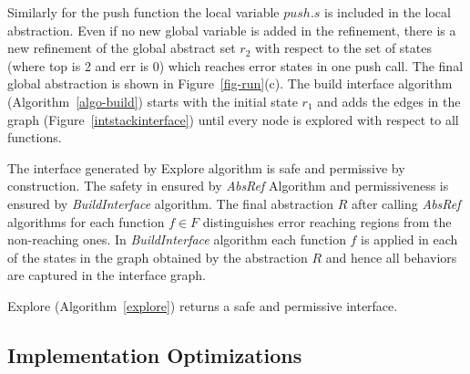 \documentclass{llncs}
\begin{document}
\begin{example}
Similarly for the push function  the local variable $push.s$ is included in the local abstraction.
Even if no new global variable is added in the refinement,  there is a new refinement of the global
abstract set $r_2$ with respect to the set of states (where top is 2 and err is 0) which reaches error 
states in one push call. 
The final global abstraction is shown in Figure~\ref{fig-run}(c).
The build interface algorithm (Algorithm~\ref{algo-build}) starts with the initial state $r_1$ 
and adds the edges in the graph (Figure~\ref{intstackinterface}) until every node is explored with 
respect to all functions. 
\end{example}

The interface generated by Explore algorithm is safe and permissive by construction. 
The safety in ensured by {\em AbsRef} Algorithm and permissiveness is ensured by 
{\em BuildInterface} algorithm.
The final abstraction $R$ after calling {\em AbsRef} algorithms for each function $f \in F$ distinguishes
error reaching regions from the non-reaching ones.	
In {\em BuildInterface} algorithm each function $f$ is applied in each of the states in the graph obtained
by the abstraction $R$ and hence all behaviors are captured in the interface graph.
\begin{theorem}
\label{theo-safety-permissive}
Explore (Algorithm~\ref{explore}) returns a safe and permissive interface.
\end{theorem}


\subsection{Implementation Optimizations}
\end{document}
